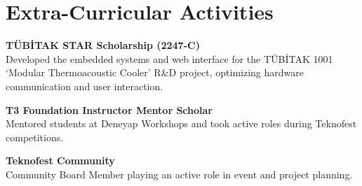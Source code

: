 \section{Extra-Curricular Activities}

\textbf{TÜBİTAK STAR Scholarship (2247-C)} \\
Developed the embedded systems and web interface for the TÜBİTAK 1001 `Modular Thermoacoustic Cooler' R\&D project, optimizing hardware communication and user interaction.

\vspace{0.3em}

\textbf{T3 Foundation Instructor Mentor Scholar} \\
Mentored students at Deneyap Workshops and took active roles during Teknofest competitions.

\vspace{0.3em}

\textbf{Teknofest Community} \\
Community Board Member playing an active role in event and project planning.
